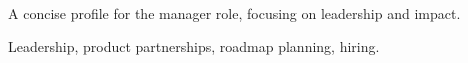 \documentclass{resume}
\begin{document}
\begin{center}
  {\resumename}\\
  {\resumecontact}
\end{center}

A concise profile for the manager role, focusing on leadership and impact.


Leadership, product partnerships, roadmap planning, hiring.
\end{document}
